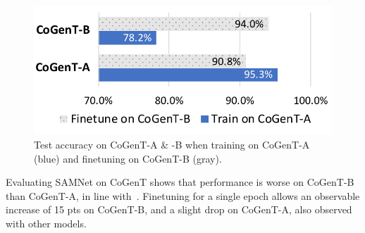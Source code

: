 \begin{figure}[!t]
	\centering
	\includegraphics[width=0.8\columnwidth]{img/results/CoGenT_B_results.pdf}
	\caption{Test accuracy on CoGenT-A \& -B when training on CoGenT-A (blue) and finetuning on CoGenT-B (gray).}
	\label{fig:CoGenT-B-results}
\end{figure}
Evaluating SAMNet on CoGenT shows that performance is worse on CoGenT-B than CoGenT-A, in line with~\cite{johnson2017inferring, mascharka2018transparency, perez2018film}. Finetuning for a single epoch allows an observable increase of 15 pts on CoGenT-B, and a slight drop on CoGenT-A, also observed with other models.
